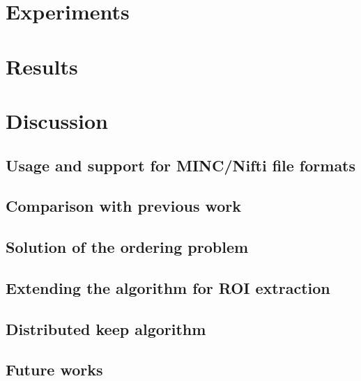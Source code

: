 \documentclass[conference]{IEEEtran}
\begin{document}
\section{Experiments}


\section{Results}

\section{Discussion}

\subsection{Usage and support for MINC/Nifti file formats}
\subsection{Comparison with previous work}
\subsection{Solution of the ordering problem}
\subsection{Extending the algorithm for ROI extraction}
\subsection{Distributed keep algorithm}
\subsection{Future works}
\end{document}
